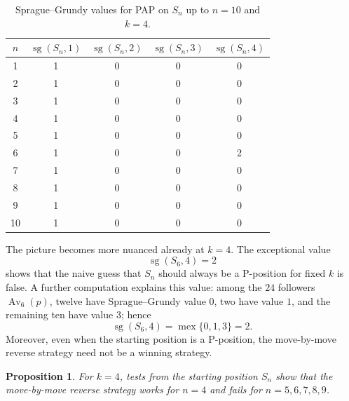 \documentclass[11pt]{amsart}
\newcommand{\Sym}{S}
\newcommand{\Av}{\operatorname{Av}}
\newcommand{\mex}{\operatorname{mex}}
\newcommand{\sg}{\operatorname{sg}}
\theoremstyle{plain}
\newtheorem{proposition}[theorem]{Proposition}
\theoremstyle{definition}
\theoremstyle{remark}
\begin{document}
\begin{table}[ht]
  \centering
  \begin{tabular}{ccccc}
    \toprule
    $n$ & $\sg(\Sym_n,1)$ & $\sg(\Sym_n,2)$ & $\sg(\Sym_n,3)$ & $\sg(\Sym_n,4)$ \\
    \midrule
    1   & 1               & 0               & 0               & 0               \\
    2   & 1               & 0               & 0               & 0               \\
    3   & 1               & 0               & 0               & 0               \\
    4   & 1               & 0               & 0               & 0               \\
    5   & 1               & 0               & 0               & 0               \\
    6   & 1               & 0               & 0               & 2               \\
    7   & 1               & 0               & 0               & 0               \\
    8   & 1               & 0               & 0               & 0               \\
    9   & 1               & 0               & 0               & 0               \\
    10  & 1               & 0               & 0               & 0               \\
    \bottomrule
  \end{tabular}
  \caption{Sprague--Grundy values for PAP on $\Sym_n$ up to $n=10$ and $k=4$.}
  \label{tab:sgvalues}
\end{table}

The picture becomes more nuanced already at $k=4$.  The exceptional value
\[
  \sg(\Sym_6,4)=2
\]
shows that the naive guess that $\Sym_n$ should always be a P-position for fixed $k$ is false.
A further computation explains this value: among the $24$ followers $\Av_6(p)$, twelve have
Sprague--Grundy value $0$, two have value $1$, and the remaining ten have value $3$; hence
\[
  \sg(\Sym_6,4)=\mex\{0,1,3\}=2.
\]
Moreover, even when the starting position is a P-position, the move-by-move reverse strategy
need not be a winning strategy.

\begin{proposition}\label{prop:k4-reverse-data}
  For $k=4$, tests from the starting position $\Sym_n$ show that the
  move-by-move reverse strategy works for $n=4$ and fails for $n=5,6,7,8,9$.
\end{proposition}
\end{document}
